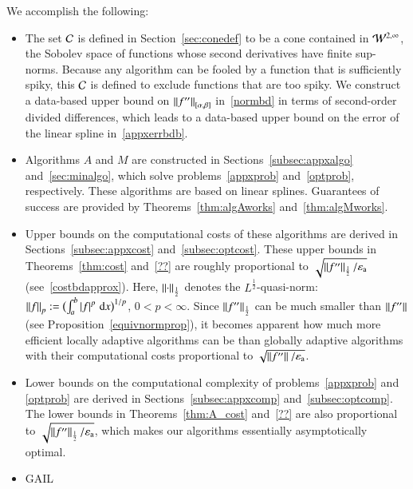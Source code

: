 \documentclass[review]{elsarticle}
\newcommand{\abstol}{\varepsilon_{\textrm{a}}}
\theoremstyle{definition}
\begin{document}
We accomplish the following:
\begin{itemize}

\item The set $\cc$ is defined in Section~\ref{sec:conedef} to be a cone contained in $\cw^{2,\infty}$, the Sobolev space of functions whose second derivatives have finite sup-norms.  Because any algorithm can be fooled by a function that is sufficiently spiky, this $\cc$ is defined to exclude functions that are too spiky.  We construct a data-based upper bound on $\norm[{[\alpha,\beta]}]{f''}$ in~\eqref{normbd} in terms of second-order divided differences, which leads to a data-based upper bound on the error of the linear spline in~\eqref{appxerrbdb}.

\item Algorithms $A$ and $M$ are constructed in Sections~\ref{subsec:appxalgo} and~\ref{sec:minalgo}, which solve problems~\eqref{appxprob}
and~\eqref{optprob}, respectively.  These algorithms are based on linear splines.  Guarantees of success are provided by Theorems~\ref{thm:algAworks}
and~\ref{thm:algMworks}.

\item Upper bounds on the computational costs of these algorithms  are derived in Sections~\ref{subsec:appxcost} and~\ref{subsec:optcost}.  These upper bounds in Theorems~\ref{thm:cost} and~\ref{??} are roughly proportional to $\sqrt{\norm[\frac12]{f''}/\abstol}$ (see~\eqref{costbdapprox}).  Here, $\norm[\frac12]{\cdot}$ denotes the $L^{\frac12}$-quasi-norm:  $\norm[p]{f} := \bigl(\int_a^b \abs{f}^p \, \dif x \bigr)^{1/p}$, $0 < p < \infty$.  Since $\norm[\frac12]{f''}$ can be much smaller than $\norm{f''}$ (see
Proposition~\ref{equivnormprop}), it becomes apparent how much more efficient locally adaptive algorithms can be than globally adaptive algorithms with their computational costs  proportional to $\sqrt{\norm{f''}/\abstol}$.

\item Lower bounds on the computational complexity of problems~\eqref{appxprob} and \eqref{optprob} are derived in Sections~\ref{subsec:appxcomp}
and~\ref{subsec:optcomp}.  The lower bounds in Theorems~\ref{thm:A_cost} and~\ref{??} are also proportional to $\sqrt{\norm[\frac12]{f''}/\abstol}$, which makes our algorithms essentially asymptotically optimal.

\item GAIL

\end{itemize}
\end{document}
